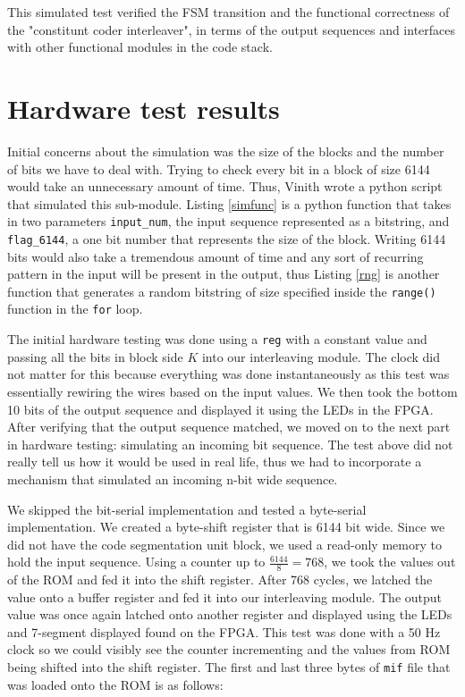 \documentclass[letterpaper, 12pt]{article} %
\begin{document}
This simulated test verified the FSM transition and the functional correctness of the "constitunt coder interleaver", in terms of the output sequences and interfaces with other functional modules in the code stack.\\
\section{Hardware test results}
Initial concerns about the simulation was the size of the blocks and the number of bits we have to deal with. Trying to check every bit in a block of size 6144 would take an unnecessary amount of time. Thus, Vinith wrote a python script that simulated this sub-module. Listing \ref{simfunc} is a python function that takes in two parameters \texttt{input\_num}, the input sequence represented as a bitstring, and \texttt{flag\_6144}, a one bit number that represents the size of the block. Writing 6144 bits would also take a tremendous amount of time and any sort of recurring pattern in the input will be present in the output, thus Listing \ref{rng} is another function that generates a random bitstring of size specified inside the \texttt{range()} function in the \texttt{for} loop.\par
The initial hardware testing was done using a \texttt{reg} with a constant value and passing all the bits in block side $K$ into our interleaving module. The clock did not matter for this because everything was done instantaneously as this test was essentially rewiring the wires based on the input values. We then took the bottom 10 bits of the output sequence and displayed it using the LEDs in the FPGA. After verifying that the output sequence matched, we moved on to the next part in hardware testing: simulating an incoming bit sequence. The test above did not really tell us how it would be used in real life, thus we had to incorporate a mechanism that simulated an incoming n-bit wide sequence. \par
We skipped the bit-serial implementation and tested a byte-serial implementation. We created a byte-shift register that is 6144 bit wide. Since we did not have the code segmentation unit block, we used a read-only memory to hold the input sequence. Using a counter up to $\frac{6144}{8} = 768$, we took the values out of the ROM and fed it into the shift register. After 768 cycles, we latched the value onto a buffer register and fed it into our interleaving module. The output value was once again latched onto another register and displayed using the LEDs and 7-segment displayed found on the FPGA. This test was done with a 50 Hz clock so we could visibly see the counter incrementing and the values from ROM being shifted into the shift register. The first and last three bytes of \texttt{mif} file that was loaded onto the ROM is as follows:
\end{document}

